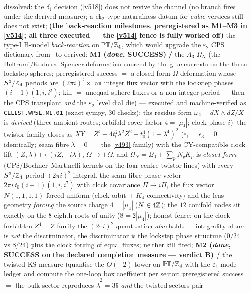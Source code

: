 dissolved: the $\delta_1$ decision (\vref{v518}) does not revive the channel (no branch fires
under the derived measure); a
ch$_2$-type naturalness datum for \emph{cubic} vertices still does not exist;
\textbf{(the back-reaction milestones, preregistered as M1--M3 in \vref{v514}; all three
executed --- the \vref{v514} fence is fully worked off)} the
type-I B-model
\emph{back-reaction} on $\mathbb{PT}/\mathbb Z_4$, which would upgrade the $\varepsilon_2$ CPS
dictionary from \mC\ to derived: \textbf{M1 (\emph{done}, SUCCESS) \mE/\mC} the $A_3$ $\Omega_N$
(the Beltrami/Kodaira--Spencer
deformation sourced by the glue currents on the three lockstep spheres; preregistered success $=$ a
closed-form $\Omega$-deformation whose $S^3/\mathbb Z_4$ periods are $(2\pi i)^2\times$ an integer flux
vector with the lockstep phases $(i-1)(1,i,i^2)$; kill $=$ unequal sphere fluxes or a
non-integer period --- then the CPS transplant \emph{and} the $\varepsilon_2$ level dial die) ---
executed and machine-verified as \texttt{CELEST.WP5E.M1.01}
 (exact sympy, $30$ checks): the residue form
$\omega_2=dX{\wedge}dZ/X$ is \emph{derived} (three ambient routes; orbifold-cover factor
$4=|\mu_4|$; clock phase $i$), the twistor family closes as
$XY=Z^4+4t_0^2\lambda^2Z^2-t_0^4(1-\lambda^4)^2$ ($e_1=e_3=0$ identically; seam fibre $\lambda=0$
$=$ the \vref{v493} family) with the CY-compatible clock lift
$(Z,\lambda)\mapsto(iZ,-i\lambda)$, $\Omega\to+\Omega$, and
$\Omega_N=\Omega_0+\sum_pN_pK_p$ is \emph{closed form} (CPS/Bochner--Martinelli kernels on the
four centre twistor lines) with every $S^3/\mathbb Z_4$ period $(2\pi i)^2$-integral, the seam-fibre
phase vector $2\pi i\,t_0(i-1)(1,i,i^2)$ with clock covariance $\Pi\to i\Pi$, the flux vector
$N(1,1,1,1)$ forced uniform (clock orbit $+$ $K_4$ connectivity) and the lens geometry
\emph{forcing} the source charge $4=|\mu_4|$ ($N\in4\mathbb Z$); the $12$ conifold nodes sit exactly on
the $8$ eighth roots of unity ($8=2|\mu_4|$); honest fence: on the clock-forbidden $Z^4-Z$
family the $(2\pi i)^2$ quantisation \emph{also} holds --- integrality alone is \emph{not} the
discriminator, the discriminator is the lockstep phase structure ($0/24$ vs $8/24$) plus the
clock forcing of equal fluxes; neither kill fired;
\textbf{M2 (\emph{done}, SUCCESS on the declared completion measure --- verdict B) \mE/\mC} the
twisted KS measure (quantise the $O(-2)$ tower on $\mathbb{PT}/\mathbb Z_4$ with the
$\varepsilon_1$ mode ledger and compute the one-loop box coefficient per sector; preregistered
success $=$ the bulk sector reproduces $\tilde\lambda^2=36$ \emph{and} the twisted sectors pair
